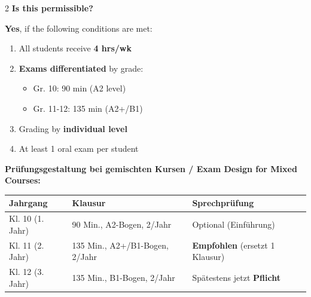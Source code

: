 \documentclass[10pt,a4paper]{article}
\begin{document}
\begin{paracol}{2}
\textbf{Is this permissible?}

\textbf{Yes}, if the following conditions are met:
\begin{enumerate}[noitemsep,topsep=2pt]
\item All students receive \textbf{4 hrs/wk}
\item \textbf{Exams differentiated} by grade:
\begin{itemize}[noitemsep,topsep=1pt]
\item[-] Gr. 10: 90 min (A2 level)
\item[-] Gr. 11-12: 135 min (A2+/B1)
\end{itemize}
\item Grading by \textbf{individual level}
\item At least 1 oral exam per student
\end{enumerate}

\end{paracol}

\vspace{2mm}

\begin{center}
\small
\textbf{Prüfungsgestaltung bei gemischten Kursen / Exam Design for Mixed Courses:}
\vspace{1mm}

\begin{tabular}{|p{2.5cm}|p{4.5cm}|p{4.5cm}|}
\hline
\rowcolor{lightgray}
\textbf{Jahrgang} & \textbf{Klausur} & \textbf{Sprechprüfung} \\
\hline
Kl. 10 (1. Jahr) & 90 Min., A2-Bogen, 2/Jahr & Optional (Einführung) \\
\hline
Kl. 11 (2. Jahr) & 135 Min., A2+/B1-Bogen, 2/Jahr & \textbf{Empfohlen} (ersetzt 1 Klausur) \\
\hline
Kl. 12 (3. Jahr) & 135 Min., B1-Bogen, 2/Jahr & Spätestens jetzt \textbf{Pflicht} \\
\hline
\end{tabular}
\end{center}

\vspace{2mm}
\end{document}
